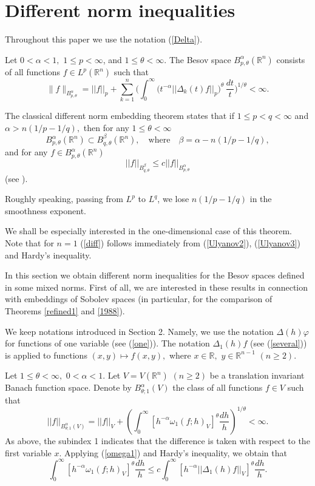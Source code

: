 \documentclass[12pt,twoside,reqno]{amsart}
\numberwithin{equation}{section}
\theoremstyle{definition}
\numberwithin{equation}{section}
\def\a{\alpha}
\def\b{\beta}
\def\o{\omega}
\def\R{\mathbb{R}}
\def\t{\theta}
\def\f{\varphi}
\begin{document}
\vskip 6pt






\section{Different norm inequalities}

\vskip 6pt

Throughout this paper we use the notation (\ref{Delta}).


Let $0<\a<1,$  $1\le p<\infty$, and $1\le \t<\infty.$
 The Besov space
$B^\a_{p,\t}(\mathbb R^n)$ consists of all functions $f\in
L^p(\mathbb R^n)$ such that
$$
\|f\|_{B^\a_{p,\t}}=||f||_p+
\sum_{k=1}^n\Big(\int_0^{\infty}\big(t^{-\a}||\Delta_k(t)f||_p\big)^\t\,
\frac{dt}{t}\Big)^{1/\t}<\infty.
$$

\vskip 6pt

The classical different norm embedding theorem states that if $1\le p<q<\infty$ and $\a>n(1/p-1/q),$ then for any $1\le\t<\infty$
$$
B_{p,\t}^\a(\R^n)\subset B_{q,\t}^\b(\R^n),\quad\mbox{where} \quad \b= \a-n(1/p-1/q),
$$
and for any $f\in B_{p,\t}^\a(\R^n)$
\begin{equation}\label{diff}
||f||_{B^\b_{q,\t}}\le c||f||_{B^\a_{p,\t}}
\end{equation}
(see \cite[Ch. 6]{Nik}).

Roughly speaking, passing from $L^p$ to $L^q$, we lose $n(1/p-1/q)$ in the  smoothness exponent.

We shall be especially interested in the one-dimensional case of this theorem.
Note that   for $n=1$ (\ref{diff}) follows immediately from (\ref{Ulyanov2}), (\ref{Ulyanov3}) and Hardy's inequality.

In this section we obtain different norm inequalities for the Besov spaces defined in some mixed norms. First of all, we are interested in these results in connection with embeddings of Sobolev spaces (in particular, for the comparison of Theorems \ref{refined1} and \ref{1988}).


We keep  notations introduced in Section 2. Namely, we use the notation $\Delta(h)\f$ for functions of one variable (see (\ref{one})). The  notation $\Delta_1(h)f$  (see (\ref{several})) is applied to functions $(x,y)\mapsto f(x,y),$ where
 $x\in \R, \,\, y\in \R^{n-1}\,\,(n\ge 2)$.


Let $1\le \t<\infty, \,\, 0<\a<1.$ Let $V=V(\R^n)\,\,(n\ge 2)$ be a translation invariant Banach function space. Denote by $B^\a_{\t;1}(V)$ the class of all functions $f\in V$ such that
$$
||f||_{B^\a_{\t;1}(V)}= ||f||_V+\left(\int_0^\infty[h^{-\a}\o_1(f;h)_V]^\t \frac{dh}{h}\right)^{1/\t}<\infty.
$$
As above, the  subindex 1 indicates that the difference is taken with respect to the first variable $x.$  Applying (\ref{omega1}) and Hardy's inequality, we obtain that
\begin{equation}\label{equivalence}
\int_0^\infty[h^{-\a}\o_1(f;h)_V]^\t \frac{dh}{h}\le c\int_0^\infty[h^{-\a}||\Delta_1(h)f||_V]^\t \frac{dh}{h}.
\end{equation}
\end{document}
